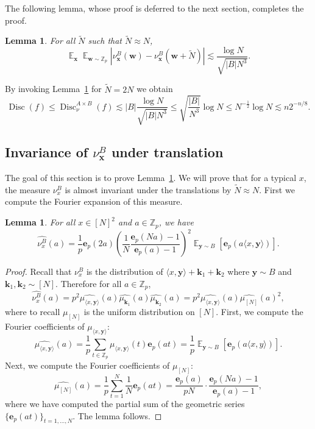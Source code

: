 \documentclass[11pt]{article}
\numberwithin{equation}{section}
\newtheorem{lemma}[theorem]{Lemma}
\theoremstyle{definition}
\theoremstyle{plain}
\newcommand{\Z}{\mathbb Z}
\theoremstyle{definition}\newtheorem{problem}[theorem]{Problem}\theoremstyle{plain}
\DeclareMathOperator{\Ex}{{\mathbb E}}
\DeclareMathOperator{\Disc}{Disc}
\newcommand{\e}{\mathbf{e}}
\newcommand{\x}{\mathbf{x}}
\newcommand{\y}{\mathbf{y}}
\newcommand{\w}{\mathbf{w}}
\newcommand{\Bk}{\mathbf{k}}   %
\newcommand{\ip}[1]{\langle #1 \rangle}
\begin{document}
 The following lemma, whose proof is deferred to the next section, completes the proof.
 \begin{lemma}\label{lemma:TranslationBound}
	For all $\tilde{N}$ such that $\tilde{N}\approx N$, $$ \Ex_\x  \Ex_{\w \sim \Z_p} |\nu_{\x}^B(\w) -\nu_{\x}^B(\w+\tilde{N})|\lesssim \frac{\log N}{\sqrt{|B|N^3}}.$$
\end{lemma}

	By invoking Lemma~\ref{lemma:TranslationBound} for $\tilde{N}=2N$ we obtain
%
	$$ \Disc(f) \leq \Disc^{A \times B}_\nu(f) \lesssim  |B| \frac{\log N  }{\sqrt{|B|N^3}}\leq \sqrt{\frac{|B|}{N^3}}\log N \leq N^{-\frac{1}{2}}\log N \lesssim n 2^{-n/8}.$$


\subsection{Invariance of $\nu^B_\x$ under translation}
The goal of this section is to prove Lemma~\ref{lemma:TranslationBound}.
We will prove that for a typical $x$, the measure $\nu^B_x$ is almost invariant under the translations by  $\tilde{N} \approx N$. First we compute the Fourier  expansion of this measure.

\begin{lemma}\label{lemma:fouriercoeffs}
	For all $x \in [N]^2$ and $a\in \Z_p$, we have
	$$\widehat{\nu^B_x}(a) =  \frac{1}{p} \e_p(2a)   \left(\frac{1}{N} \frac{\e_p(Na)-1}{\e_p(a)-1}\right)^2   \Ex_{\y \sim B}   \left[ \e_p(a\ip{x,\y})\right].
	$$
\end{lemma}
\begin{proof}
	Recall that $\nu^B_x$ is the distribution of $\ip{x,\y}+\Bk_1+\Bk_2$ where $\y\sim B$ and $\Bk_1,\Bk_2\sim [N]$. Therefore for all $a\in \Z_p$,
	$$\widehat{\nu^B_x}(a) = p^2\widehat{\mu_{\ip{x,\y}}}(a)\widehat{\mu_{\Bk_1}}(a)\widehat{\mu_{\Bk_2}}(a) =  p^2\widehat{\mu_{\ip{x,\y}}}(a)\widehat{\mu_{[N]}}(a)^2,$$
	where to recall $\mu_{[N]}$ is the uniform distribution on $[N]$. First, we compute the Fourier coefficients of $\mu_{\ip{x,\y}}$:
	$$
		\widehat{\mu_{\ip{x,\y}}}(a) = \frac{1}{p}\sum_{t \in \Z_p} \mu_{\ip{x,\y}}(t) \e_p(at)= \frac{1}{p}  \Ex_{\y \sim B} \left[\e_p(a\ip{x,y})\right].
$$
Next, we compute the Fourier coefficients of $\mu_{[N]}$:
	$$\widehat{\mu_{[N]}}(a) =  \frac{1}{p}  \sum_{t=1}^{N} \frac{1}{N} \e_p(at) = \frac{\e_p(a)}{pN} \cdot \frac{\e_p(Na)-1}{\e_p(a)-1},$$
	where we have computed the partial sum of the geometric series $\{\e_p(at)\}_{t=1,\ldots,N}$.
The lemma follows. 
\end{proof}
\end{document}
